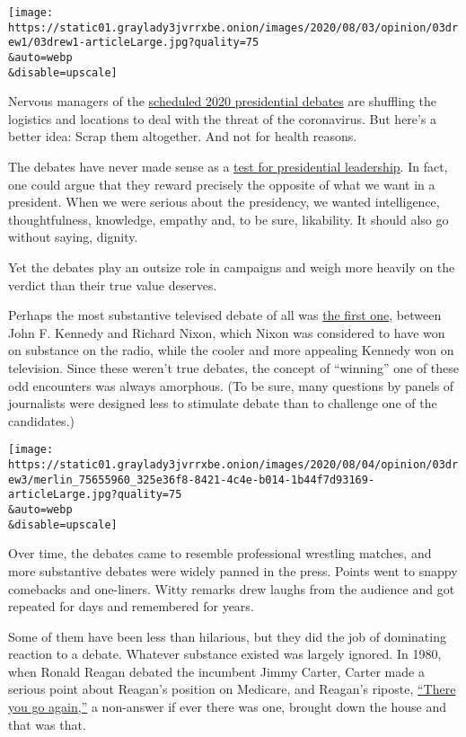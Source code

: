 \texttt{[image: https://static01.graylady3jvrrxbe.onion/images/2020/08/03/opinion/03drew1/03drew1-articleLarge.jpg?quality=75\\\&auto=webp\\\&disable=upscale]}

Nervous managers of the
\href{https://ballotpedia.org/Presidential_debates,_2020}{scheduled 2020
presidential debates} are shuffling the logistics and locations to deal
with the threat of the coronavirus. But here's a better idea: Scrap them
altogether. And not for health reasons.

The debates have never made sense as a
\href{https://www.nytimes3xbfgragh.onion/2019/12/19/opinion/presidential-debate-alternatives.html}{test
for presidential leadership}. In fact, one could argue that they reward
precisely the opposite of what we want in a president. When we were
serious about the presidency, we wanted intelligence, thoughtfulness,
knowledge, empathy and, to be sure, likability. It should also go
without saying, dignity.

Yet the debates play an outsize role in campaigns and weigh more heavily
on the verdict than their true value deserves.

Perhaps the most substantive televised debate of all was
\href{https://learning.blogs.nytimes3xbfgragh.onion/2011/09/26/septe-26-1960-first-televised-presidential-debate/}{the
first one}, between John F. Kennedy and Richard Nixon, which Nixon was
considered to have won on substance on the radio, while the cooler and
more appealing Kennedy won on television. Since these weren't true
debates, the concept of ``winning'' one of these odd encounters was
always amorphous. (To be sure, many questions by panels of journalists
were designed less to stimulate debate than to challenge one of the
candidates.)

\texttt{[image: https://static01.graylady3jvrrxbe.onion/images/2020/08/04/opinion/03drew3/merlin\_75655960\_325e36f8-8421-4c4e-b014-1b44f7d93169-articleLarge.jpg?quality=75\\\&auto=webp\\\&disable=upscale]}

Over time, the debates came to resemble professional wrestling matches,
and more substantive debates were widely panned in the press. Points
went to snappy comebacks and one-liners. Witty remarks drew laughs from
the audience and got repeated for days and remembered for years.

Some of them have been less than hilarious, but they did the job of
dominating reaction to a debate. Whatever substance existed was largely
ignored. In 1980, when Ronald Reagan debated the incumbent Jimmy Carter,
Carter made a serious point about Reagan's position on Medicare, and
Reagan's riposte,
\href{https://www.nytimes3xbfgragh.onion/politics/first-draft/2014/10/28/on-this-day-there-you-go-again/}{``There
you go again,''} a non-answer if ever there was one, brought down the
house and that was that.

